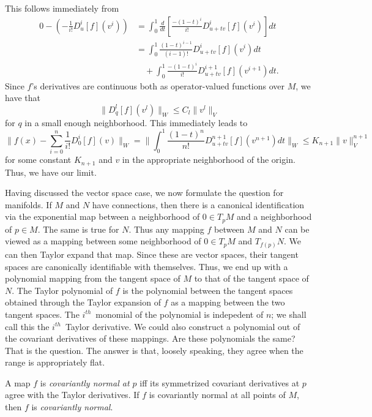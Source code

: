 \documentclass[11pt]{article}
\theoremstyle{remark}
\begin{document}
This follows immediately from 
\[\begin{split}
0 - (-\frac{1}{i!} \ensuremath{D_{u}^{i} {[f]} ({v^{i}}) }) &= \int_{0}^1
\ensuremath{\frac{d{}}{d{t}}}[\frac{-(1-t)^i}{i!}
\ensuremath{D_{u+tv}^{i} {[f]} ({v^{i}}) }] dt \\
&=  \int_{0}^1 \frac{(1-t)^{i-1}}{(i-1)!} \ensuremath{D_{u+tv}^{i} {[f]} ({v^{i}}) } dt 
\\&\quad+ \int_{0}^1 \frac{-(1-t)^i}{i!} \ensuremath{D_{u+tv}^{i+1} {[f]} ({v^{i+1}}) }   dt.
\end{split}
\]
Since $f$'s  derivatives are continuous both as operator-valued
functions over $M$, we have that 
\[
\lVert D^{l}_{q} [f] (v^{l}) \rVert_W \leq C_l \lVert v^{l}  \rVert_V
\]
for  $q$ in a small enough neighborhood.
This immediately leads to  
\[
{\lVert f(x) - \sum_{i=0}^n \frac{1}{i!} \ensuremath{D_{0}^{i} {[f]} ({v}) } \rVert_W }
=  \lVert \int_{0}^1 \frac{(1-t)^n}{n!} \ensuremath{D_{u+tv}^{n+1} {[f]} ({v^{n+1}}) }
dt
\rVert_W \leq K_{n+1} \lVert v \rVert_V^{n+1}  
\]
for some constant $K_{n+1}$ and $v$ in the appropriate neighborhood of
the origin.
Thus, we have our limit. 

Having discussed the vector space case, we now formulate
the question for manifolds. If $M$ and $N$ have connections, then
there is a canonical identification via the exponential map 
between a neighborhood of $0\in
T_pM$ and a neighborhood of $p \in M$. The same is true for $N$. Thus
any mapping $f$ between $M$ and $N$ can be viewed as a mapping between
some neighborhood of $0 \in T_pM$ and $T_{f(p)}N$. We can then Taylor
expand that map. Since these are vector spaces, their tangent spaces
are canonically identifiable with themselves. Thus, we end up with a
polynomial mapping from the tangent space of $M$ to that of the
tangent space of $N$. 
The Taylor polynomial of $f$ is the polynomial between the tangent
spaces obtained through the Taylor expansion of $f$ as a mapping
between the two tangent spaces. The \ensuremath{{i}^{th}}\ monomial of the
polynomial is indepedent of $n$; we shall call this the \ensuremath{{i}^{th}}\
Taylor derivative.
We could also construct a polynomial out of the
covariant derivatives of these mappings. Are these polynomials the
same? That is the question. The answer is that, loosely
speaking, they  agree when the range is appropriately 
flat. 

A map $f$ is \emph{covariantly normal at $p$} iff its
symmetrized covariant derivatives at $p$ agree with the Taylor
derivatives. If $f$ is covariantly normal at all points of $M$, then
$f$ is \emph{covariantly normal}. 
\end{document}

